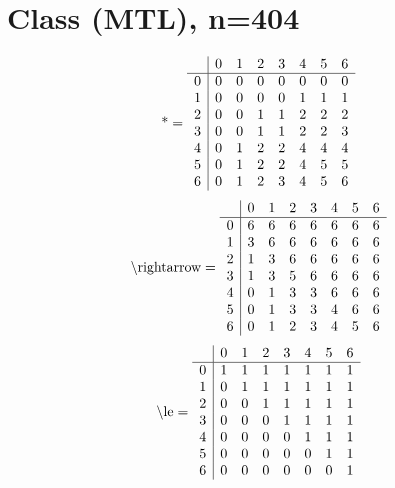 \documentclass[11pt]{article}
\begin{document}
\section{Class (MTL), n=404}
\[\text{*} = 
\begin{array}{r | r r r r r r r}
 & 0 & 1 & 2 & 3 & 4 & 5 & 6 \\ \hline
0 & 0 & 0 & 0 & 0 & 0 & 0 & 0 \\
1 & 0 & 0 & 0 & 0 & 1 & 1 & 1 \\
2 & 0 & 0 & 1 & 1 & 2 & 2 & 2 \\
3 & 0 & 0 & 1 & 1 & 2 & 2 & 3 \\
4 & 0 & 1 & 2 & 2 & 4 & 4 & 4 \\
5 & 0 & 1 & 2 & 2 & 4 & 5 & 5 \\
6 & 0 & 1 & 2 & 3 & 4 & 5 & 6 \\
\end{array}
\]
\[\text{\textbackslash rightarrow} = 
\begin{array}{r | r r r r r r r}
 & 0 & 1 & 2 & 3 & 4 & 5 & 6 \\ \hline
0 & 6 & 6 & 6 & 6 & 6 & 6 & 6 \\
1 & 3 & 6 & 6 & 6 & 6 & 6 & 6 \\
2 & 1 & 3 & 6 & 6 & 6 & 6 & 6 \\
3 & 1 & 3 & 5 & 6 & 6 & 6 & 6 \\
4 & 0 & 1 & 3 & 3 & 6 & 6 & 6 \\
5 & 0 & 1 & 3 & 3 & 4 & 6 & 6 \\
6 & 0 & 1 & 2 & 3 & 4 & 5 & 6 \\
\end{array}
\]
\[\text{\textbackslash le} = 
\begin{array}{r | r r r r r r r}
 & 0 & 1 & 2 & 3 & 4 & 5 & 6 \\ \hline
0 & 1 & 1 & 1 & 1 & 1 & 1 & 1 \\
1 & 0 & 1 & 1 & 1 & 1 & 1 & 1 \\
2 & 0 & 0 & 1 & 1 & 1 & 1 & 1 \\
3 & 0 & 0 & 0 & 1 & 1 & 1 & 1 \\
4 & 0 & 0 & 0 & 0 & 1 & 1 & 1 \\
5 & 0 & 0 & 0 & 0 & 0 & 1 & 1 \\
6 & 0 & 0 & 0 & 0 & 0 & 0 & 1 \\
\end{array}
\]
\end{document}
